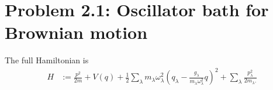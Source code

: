 \documentclass[english, parskip=full]{scrartcl}
\title{\titel}
\author{\autor}
\date{\today}
\newcommand{\kla}{}
\begin{document}
\maketitle  %

\section*{Problem 2.1: Oscillator bath for Brownian motion}
The full Hamiltonian is
\begin{align}
H&:=\frac{p^2}{2m}+V(q)+\frac{1}{2} \sum_\lambda m_\lambda\omega_\lambda^2 \kla\left( q_\lambda - \frac{g_\lambda}{m_\lambda\omega_\lambda^2}q \right)^2 + \sum_\lambda \frac{p_\lambda^2}{2m_\lambda.}
\end{align}
\end{document}
